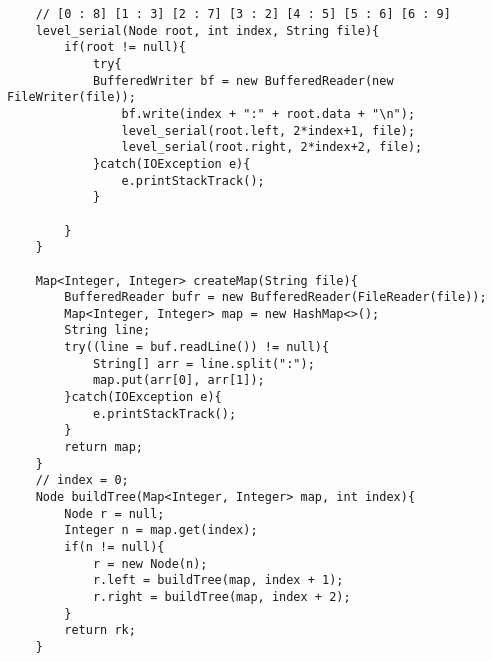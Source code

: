 \documentclass{article}
\begin{document}
\begin{enumerate}
\begin{itemize}
\begin{itemize}
\begin{itemize}

            \begin{center}
            \end{center}
    \begin{verbatim}
    // [0 : 8] [1 : 3] [2 : 7] [3 : 2] [4 : 5] [5 : 6] [6 : 9]
    level_serial(Node root, int index, String file){
        if(root != null){
            try{
            BufferedWriter bf = new BufferedReader(new FileWriter(file)); 
                bf.write(index + ":" + root.data + "\n");
                level_serial(root.left, 2*index+1, file);
                level_serial(root.right, 2*index+2, file);
            }catch(IOException e){
                e.printStackTrack();
            }
            
        }
    }

    Map<Integer, Integer> createMap(String file){
        BufferedReader bufr = new BufferedReader(FileReader(file));         
        Map<Integer, Integer> map = new HashMap<>();
        String line;
        try((line = buf.readLine()) != null){
            String[] arr = line.split(":");
            map.put(arr[0], arr[1]);
        }catch(IOException e){
            e.printStackTrack();
        }
        return map;
    }
    // index = 0;
    Node buildTree(Map<Integer, Integer> map, int index){
        Node r = null;
        Integer n = map.get(index); 
        if(n != null){
            r = new Node(n);
            r.left = buildTree(map, index + 1);
            r.right = buildTree(map, index + 2);
        }
        return rk;
    }


\end{verbatim}
\end{itemize}
\end{itemize}
\end{itemize}
\end{enumerate}
\end{document}
